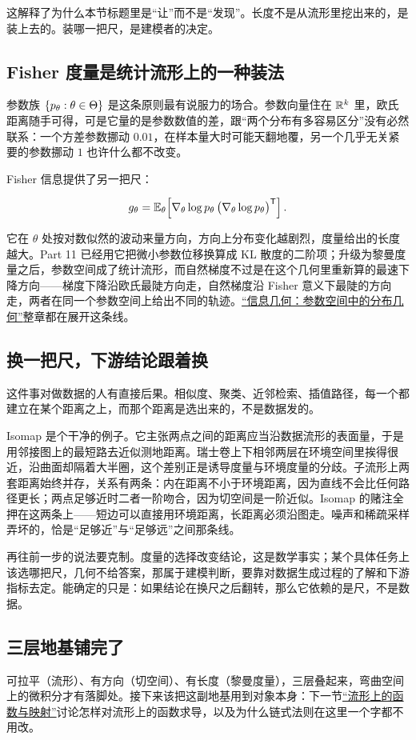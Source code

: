 这解释了为什么本节标题里是``让''而不是``发现''。长度不是从流形里挖出来的，是装上去的。装哪一把尺，是建模者的决定。

\subsection{Fisher 度量是统计流形上的一种装法}

参数族 \(\left\{p_{\theta}:\theta\in\Theta\right\}\) 是这条原则最有说服力的场合。参数向量住在 \(\mathbb{R}^{k}\) 里，欧氏距离随手可得，可是它量的是参数数值的差，跟``两个分布有多容易区分''没有必然联系：一个方差参数挪动 \(0.01\)，在样本量大时可能天翻地覆，另一个几乎无关紧要的参数挪动 \(1\) 也许什么都不改变。

Fisher 信息提供了另一把尺：

\[
g_{\theta}=\mathbb{E}_{\theta}\!\left[
\nabla_{\theta}\log p_{\theta}\,
\bigl(\nabla_{\theta}\log p_{\theta}\bigr)^{\mathsf{T}}
\right].
\]

它在 \(\theta\) 处按对数似然的波动来量方向，方向上分布变化越剧烈，度量给出的长度越大。Part 11 已经用它把微小参数位移换算成 KL 散度的二阶项；升级为黎曼度量之后，参数空间成了统计流形，而自然梯度不过是在这个几何里重新算的最速下降方向——梯度下降沿欧氏最陡方向走，自然梯度沿 Fisher 意义下最陡的方向走，两者在同一个参数空间上给出不同的轨迹。\hyperref[ch:105]{``信息几何：参数空间中的分布几何''}整章都在展开这条线。

\subsection{换一把尺，下游结论跟着换}

这件事对做数据的人有直接后果。相似度、聚类、近邻检索、插值路径，每一个都建立在某个距离之上，而那个距离是选出来的，不是数据发的。

Isomap 是个干净的例子。它主张两点之间的距离应当沿数据流形的表面量，于是用邻接图上的最短路去近似测地距离。瑞士卷上下相邻两层在环境空间里挨得很近，沿曲面却隔着大半圈，这个差别正是诱导度量与环境度量的分歧。子流形上两套距离始终并存，关系有两条：内在距离不小于环境距离，因为直线不会比任何路径更长；两点足够近时二者一阶吻合，因为切空间是一阶近似。Isomap 的赌注全押在这两条上——短边可以直接用环境距离，长距离必须沿图走。噪声和稀疏采样弄坏的，恰是``足够近''与``足够远''之间那条线。

再往前一步的说法要克制。度量的选择改变结论，这是数学事实；某个具体任务上该选哪把尺，几何不给答案，那属于建模判断，要靠对数据生成过程的了解和下游指标去定。能确定的只是：如果结论在换尺之后翻转，那么它依赖的是尺，不是数据。

\subsection{三层地基铺完了}

可拉平（流形）、有方向（切空间）、有长度（黎曼度量），三层叠起来，弯曲空间上的微积分才有落脚处。接下来该把这副地基用到对象本身：下一节\hyperref[sec:12-Real-Analysis-Support/08-Manifold-Basics/04]{``流形上的函数与映射''}讨论怎样对流形上的函数求导，以及为什么链式法则在这里一个字都不用改。

